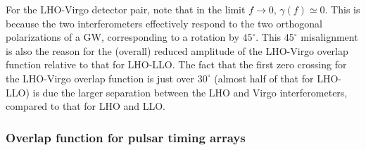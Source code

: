 For the LHO-Virgo detector pair, note 
that in the limit $f\rightarrow 0$, $\gamma(f)\simeq 0$.
This is because the two interferometers effectively respond
to the two orthogonal polarizations of a GW, corresponding 
to a rotation by $45^\circ$.
This $45^\circ$ misalignment is also the reason for the 
(overall) reduced amplitude of the LHO-Virgo overlap 
function relative to that for LHO-LLO.  
The fact that the first zero crossing for the LHO-Virgo 
overlap function is just over $30^\circ$ (almost half of 
that for LHO-LLO) is due the larger separation between the
LHO and Virgo interferometers, compared to that for LHO 
and LLO.

\subsubsection{Overlap function for pulsar timing arrays}

